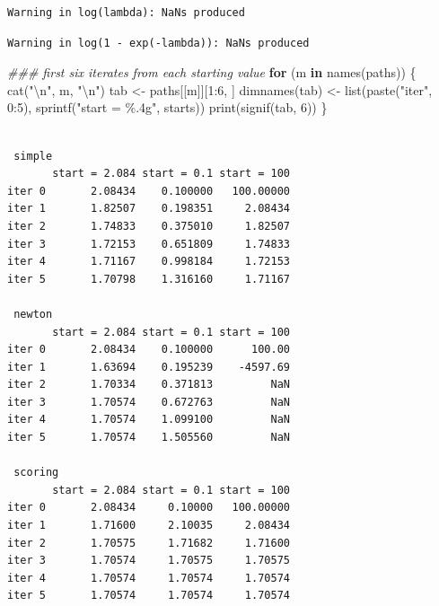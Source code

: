 \documentclass[
  letterpaper,
  DIV=11,
  numbers=noendperiod]{scrreprt}
\newenvironment{Shaded}{\begin{snugshade}}{\end{snugshade}}
\newcommand{\ControlFlowTok}[1]{\textcolor[rgb]{0.00,0.23,0.31}{\textbf{#1}}}
\newcommand{\DecValTok}[1]{\textcolor[rgb]{0.68,0.00,0.00}{#1}}
\newcommand{\DocumentationTok}[1]{\textcolor[rgb]{0.37,0.37,0.37}{\textit{#1}}}
\newcommand{\FunctionTok}[1]{\textcolor[rgb]{0.28,0.35,0.67}{#1}}
\newcommand{\NormalTok}[1]{\textcolor[rgb]{0.00,0.23,0.31}{#1}}
\newcommand{\OtherTok}[1]{\textcolor[rgb]{0.00,0.23,0.31}{#1}}
\newcommand{\SpecialCharTok}[1]{\textcolor[rgb]{0.37,0.37,0.37}{#1}}
\newcommand{\StringTok}[1]{\textcolor[rgb]{0.13,0.47,0.30}{#1}}
\begin{document}
\begin{verbatim}
Warning in log(lambda): NaNs produced
\end{verbatim}

\begin{verbatim}
Warning in log(1 - exp(-lambda)): NaNs produced
\end{verbatim}

\begin{Shaded}
\begin{Highlighting}[]
\DocumentationTok{\#\#\# first six iterates from each starting value}
\ControlFlowTok{for}\NormalTok{ (m }\ControlFlowTok{in} \FunctionTok{names}\NormalTok{(paths)) \{}
  \FunctionTok{cat}\NormalTok{(}\StringTok{"}\SpecialCharTok{\textbackslash{}n}\StringTok{"}\NormalTok{, m, }\StringTok{"}\SpecialCharTok{\textbackslash{}n}\StringTok{"}\NormalTok{)}
\NormalTok{  tab }\OtherTok{\textless{}{-}}\NormalTok{ paths[[m]][}\DecValTok{1}\SpecialCharTok{:}\DecValTok{6}\NormalTok{, ]}
  \FunctionTok{dimnames}\NormalTok{(tab) }\OtherTok{\textless{}{-}} \FunctionTok{list}\NormalTok{(}\FunctionTok{paste}\NormalTok{(}\StringTok{"iter"}\NormalTok{, }\DecValTok{0}\SpecialCharTok{:}\DecValTok{5}\NormalTok{), }\FunctionTok{sprintf}\NormalTok{(}\StringTok{"start = \%.4g"}\NormalTok{, starts))}
  \FunctionTok{print}\NormalTok{(}\FunctionTok{signif}\NormalTok{(tab, }\DecValTok{6}\NormalTok{))}
\NormalTok{\}}
\end{Highlighting}
\end{Shaded}

\begin{verbatim}

 simple 
       start = 2.084 start = 0.1 start = 100
iter 0       2.08434    0.100000   100.00000
iter 1       1.82507    0.198351     2.08434
iter 2       1.74833    0.375010     1.82507
iter 3       1.72153    0.651809     1.74833
iter 4       1.71167    0.998184     1.72153
iter 5       1.70798    1.316160     1.71167

 newton 
       start = 2.084 start = 0.1 start = 100
iter 0       2.08434    0.100000      100.00
iter 1       1.63694    0.195239    -4597.69
iter 2       1.70334    0.371813         NaN
iter 3       1.70574    0.672763         NaN
iter 4       1.70574    1.099100         NaN
iter 5       1.70574    1.505560         NaN

 scoring 
       start = 2.084 start = 0.1 start = 100
iter 0       2.08434     0.10000   100.00000
iter 1       1.71600     2.10035     2.08434
iter 2       1.70575     1.71682     1.71600
iter 3       1.70574     1.70575     1.70575
iter 4       1.70574     1.70574     1.70574
iter 5       1.70574     1.70574     1.70574
\end{verbatim}
\end{document}
